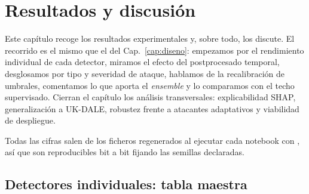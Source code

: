 \chapter{Resultados y discusión}
\label{cap:resultados}

Este capítulo recoge los resultados experimentales y, sobre todo, los discute. El recorrido es el mismo que el del Cap.~\ref{cap:diseno}: empezamos por el rendimiento individual de cada detector, miramos el efecto del postprocesado temporal, desglosamos por tipo y severidad de ataque, hablamos de la recalibración de umbrales, comentamos lo que aporta el \textit{ensemble} y lo comparamos con el techo supervisado. Cierran el capítulo los análisis transversales: explicabilidad SHAP, generalización a UK-DALE, robustez frente a atacantes adaptativos y viabilidad de despliegue.

Todas las cifras salen de los ficheros  regenerados al ejecutar cada notebook con , así que son reproducibles bit a bit fijando las semillas declaradas.

\section{Detectores individuales: tabla maestra}
\label{sec:resultados-individuales}

